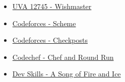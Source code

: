 \begin{itemize}
	\item \href{https://uva.onlinejudge.org/index.php?option=com_onlinejudge&Itemid=8&page=show_problem&problem=4598}{UVA 12745 - Wishmaster}
	\item \href{http://codeforces.com/contest/22/problem/E}{Codeforces - Scheme}
	\item \href{https://codeforces.com/problemset/problem/427/C}{Codeforces - Checkposts}
	\item \href{https://www.codechef.com/AUG16/problems/CHEFRRUN}{Codechef - Chef and Round Run}
	\item \href{https://devskill.com/CodingProblems/ViewProblem/79}{Dev Skills - A Song of Fire and Ice}
\end{itemize}